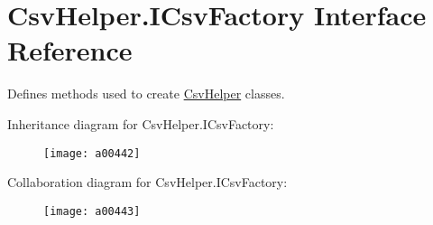 \hypertarget{a00106}{\section{Csv\-Helper.\-I\-Csv\-Factory Interface Reference}
\label{a00106}
}


Defines methods used to create \hyperlink{a00325}{Csv\-Helper} classes.  




Inheritance diagram for Csv\-Helper.\-I\-Csv\-Factory\-:
\nopagebreak
\begin{figure}[H]
\begin{center}
\leavevmode
\texttt{[image: a00442]}
\end{center}
\end{figure}


Collaboration diagram for Csv\-Helper.\-I\-Csv\-Factory\-:
\nopagebreak
\begin{figure}[H]
\begin{center}
\leavevmode
\texttt{[image: a00443]}
\end{center}
\end{figure}
